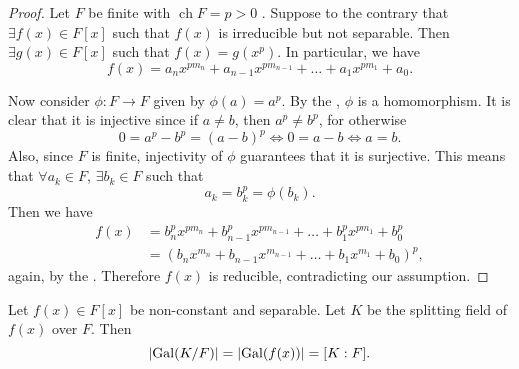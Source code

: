 \documentclass[notoc,notitlepage,nobib]{tufte-book}
\DeclareMathOperator{\Gal}{Gal}
\DeclareMathOperator{\ch}{ch}
\begin{document}
\begin{proof}
  Let $F$ be finite with $\ch F = p > 0$ . Suppose
  to the contrary that $\exists f(x) \in F[x]$ such that $f(x)$ is irreducible
  but not separable. Then $\exists g(x) \in F[x]$ such that $f(x) = g(x^p)$. In
  particular, we have
  \begin{equation*}
    f(x) = a_n x^{p m_n} + a_{n - 1} x^{p m_{n - 1}} + \hdots + a_1 x^{p m_1} +
    a_0.
  \end{equation*}

  Now consider $\phi : F \to F$ given by $\phi(a) = a^p$. By the
  , $\phi$ is a homomorphism. It is clear that it is
  injective since if $a \neq b$, then $a^p \neq b^p$, for otherwise
  \begin{equation*}
    0 = a^p - b^p = (a - b)^p \iff 0 = a - b \iff a = b.
  \end{equation*}
  Also, since $F$ is finite, injectivity of $\phi$ guarantees that it is
  surjective. This means that $\forall a_k \in F$, $\exists b_k \in F$ such that
  \begin{equation*}
    a_k = b_k^p = \phi(b_k).
  \end{equation*}
  Then we have
  \begin{align*}
    f(x) &= b_n^p x^{p m_n} + b_{n - 1}^p x^{p m_{n - 1}} + \hdots + b_1^p x^{p
          m_1} + b_0^p \\
         &= ( b_n x^{m_n} + b_{n - 1} x^{m_{n - 1}} + \hdots + b_1 x^{m_1} + b_0
          )^p,
  \end{align*}
  again, by the . Therefore $f(x)$ is reducible,
  contradicting our assumption.
\end{proof}

\begin{thm}\label{thm:galois_group_of_a_splitting_field_of_a_separable_polynomial_has_order_the_degree_of_the_extension}
  Let $f(x) \in F[x]$ be non-constant and separable. Let $K$ be the splitting
  field of $f(x)$ over $F$. Then
  \begin{equation*}
    \abs{ \Gal(K / F) } = \abs{ \Gal(f(x)) } = [ K : F ].
  \end{equation*}
\end{thm}
\end{document}
